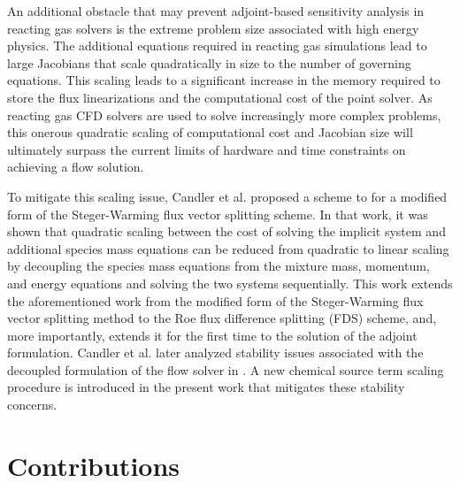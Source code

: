 An additional obstacle that may prevent adjoint-based sensitivity analysis in
reacting gas solvers is the extreme problem size associated with high energy
physics.  The additional equations required in reacting gas simulations lead to
large Jacobians that scale quadratically in size to the number of governing
equations.  This scaling leads to a significant increase in the memory required
to store the flux linearizations and the computational cost of the point solver.
As reacting gas CFD solvers are used to solve increasingly more complex
problems, this onerous quadratic scaling of computational cost and Jacobian size
will ultimately surpass the current limits of hardware and time constraints on
achieving a flow solution\cite{fischer}.

To mitigate this scaling issue, Candler et al.\cite{candler} proposed a scheme
to for a modified form of the Steger-Warming flux vector splitting
scheme\cite{MacCormack,Steger}. In that work, it was shown that quadratic
scaling between the cost of solving the implicit system and additional species
mass equations can be reduced from quadratic to linear scaling by decoupling the
species mass equations from the mixture mass, momentum, and energy equations and
solving the two systems sequentially.  This work extends the aforementioned work
from the modified form of the Steger-Warming flux vector splitting method to the
Roe flux difference splitting (FDS) scheme, and, more importantly, extends it
for the first time to the solution of the adjoint formulation.  Candler et
al.\cite{candler2013analysis} later analyzed stability issues associated with
the decoupled formulation of the flow solver in \cite{candler}.  A new chemical
source term scaling procedure is introduced in the present work that mitigates
these stability concerns.

\section{Contributions}

